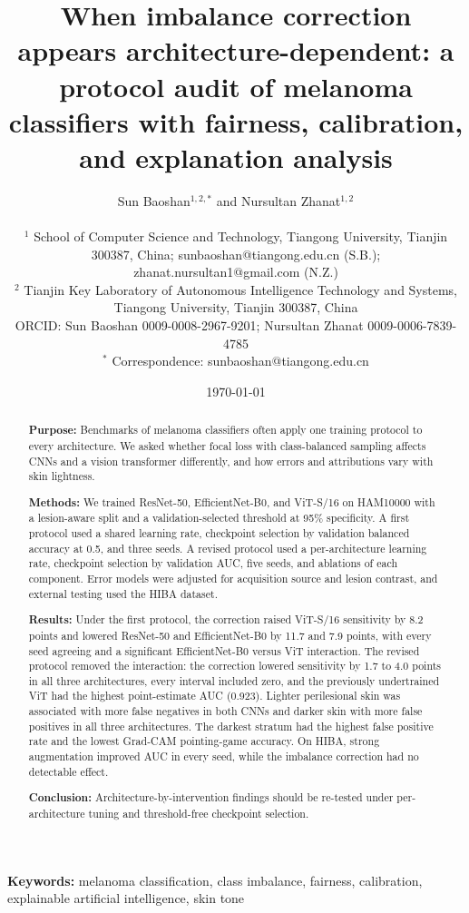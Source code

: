 \documentclass[11pt]{article}
\title{When imbalance correction appears architecture-dependent: a protocol audit of melanoma classifiers with fairness, calibration, and explanation analysis}
\author{
  Sun Baoshan$^{1,2,*}$ and Nursultan Zhanat$^{1,2}$\\[8pt]
  \parbox{0.92\textwidth}{\centering\small
  $^{1}$ School of Computer Science and Technology, Tiangong University, Tianjin 300387, China; sunbaoshan@tiangong.edu.cn (S.B.); zhanat.nursultan1@gmail.com (N.Z.)\\
  $^{2}$ Tianjin Key Laboratory of Autonomous Intelligence Technology and Systems, Tiangong University, Tianjin 300387, China\\
  ORCID: Sun Baoshan 0009-0008-2967-9201; Nursultan Zhanat 0009-0006-7839-4785\\
  $^{*}$ Correspondence: sunbaoshan@tiangong.edu.cn
  }
}
\date{\today}
\begin{document}
\maketitle

\begin{abstract}
\noindent\textbf{Purpose:} Benchmarks of melanoma classifiers often apply one training protocol to every architecture. We asked whether focal loss with class-balanced sampling affects CNNs and a vision transformer differently, and how errors and attributions vary with skin lightness.

\noindent\textbf{Methods:} We trained ResNet-50, EfficientNet-B0, and ViT-S/16 on HAM10000 with a lesion-aware split and a validation-selected threshold at 95\% specificity. A first protocol used a shared learning rate, checkpoint selection by validation balanced accuracy at 0.5, and three seeds. A revised protocol used a per-architecture learning rate, checkpoint selection by validation AUC, five seeds, and ablations of each component. Error models were adjusted for acquisition source and lesion contrast, and external testing used the HIBA dataset.

\noindent\textbf{Results:} Under the first protocol, the correction raised ViT-S/16 sensitivity by 8.2 points and lowered ResNet-50 and EfficientNet-B0 by 11.7 and 7.9 points, with every seed agreeing and a significant EfficientNet-B0 versus ViT interaction. The revised protocol removed the interaction: the correction lowered sensitivity by 1.7 to 4.0 points in all three architectures, every interval included zero, and the previously undertrained ViT had the highest point-estimate AUC (0.923). Lighter perilesional skin was associated with more false negatives in both CNNs and darker skin with more false positives in all three architectures. The darkest stratum had the highest false positive rate and the lowest Grad-CAM pointing-game accuracy. On HIBA, strong augmentation improved AUC in every seed, while the imbalance correction had no detectable effect.

\noindent\textbf{Conclusion:} Architecture-by-intervention findings should be re-tested under per-architecture tuning and threshold-free checkpoint selection.
\end{abstract}

\noindent\textbf{Keywords:} melanoma classification, class imbalance, fairness, calibration, explainable artificial intelligence, skin tone












\end{document}
